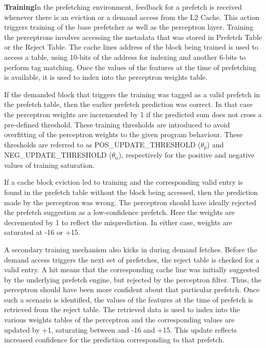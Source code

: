 
\textbf{Training}\newline In the prefetching environment, feedback for
a prefetch is received whenever there is an eviction or a demand
access from the L2 Cache.  This action triggers training of the base
prefetcher as well as the perceptron layer.  Training the perceptrons
involves accessing the metadata that was stored in Prefetch Table or
the Reject Table.  The cache lines address of the block being trained
is used to access a table, using 10-bits of the address for indexing
and another 6-bits to perform tag matching.  Once the values of the
features at the time of prefetching is available, it is
used to index into the perceptron weights table.

If the demanded block that triggers the training was tagged as a valid
prefetch in the prefetch table, then the earlier prefetch prediction
was correct.  In that case the perceptron weights are incremented by 1
if the predicted sum does not cross a pre-defined threshold. These
training thresholds are introduced to avoid overfitting of the
perceptron weights to the given program behaviour. These thresholds
are referred to as POS\_UPDATE\_THRESHOLD ($\theta_p$) and
NEG\_UPDATE\_THRESHOLD ($\theta_n$), respectively for the positive and
negative values of training saturation.

If a cache block eviction led to training and the corresponding valid
entry is found in the prefetch table without the block being accessed,
then the prediction made by the perceptron was wrong.  The perceptron
should have ideally rejected the prefetch suggestion as a
low-confidence prefetch.  Here the weights are decremented by 1 to
reflect the misprediction. In either case, weights are saturated at
-16 or +15. 

A secondary training mechanism also kicks in during demand fetches.
Before the demand access triggers the next set of prefetches, the
reject table is checked for a valid entry.  A hit means that the
corresponding cache line was initially suggested by the underlying
prefetch engine, but rejected by the perceptron filter.  Thus, the
perceptron should have been more confident about that particular
prefetch.  Once such a scenario is identified, the
values of the features at the time of prefetch is retrieved from the reject
table.  The retrieved data is used to index into the various weights
tables of the perceptron and the corresponding values are updated by
+1, saturating between and -16 and +15.  This update reflects
increased confidence for the prediction corresponding to that
prefetch.

